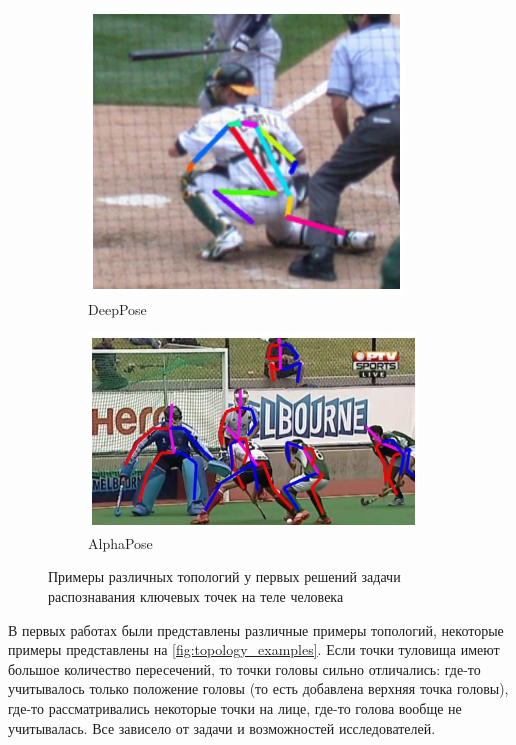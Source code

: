 \begin{figure}[h]
\begin{subfigure}[b]{.3\textwidth}
	\includegraphics[width=\textwidth]{./images/tasks/deeppose_topology.png}
	\caption{DeepPose \cite{DeepPose}}
\end{subfigure}
\begin{subfigure}[b]{.455\textwidth}
	\centering
	\includegraphics[width=\textwidth]{./images/tasks/alphapose_topology.png}
	\caption{AlphaPose \cite{AlphaPose}}
\end{subfigure}
\caption{Примеры различных топологий у первых решений задачи распознавания ключевых точек на теле человека}
\label{fig:topology_examples}
\end{figure}

В первых работах были представлены различные примеры топологий, некоторые примеры представлены на \autoref{fig:topology_examples}. Если точки туловища имеют большое количество пересечений, то точки головы сильно отличались: где-то учитывалось только положение головы (то есть добавлена верхняя точка головы), где-то рассматривались некоторые точки на лице, где-то голова вообще не учитывалась. Все зависело от задачи и возможностей исследователей.

